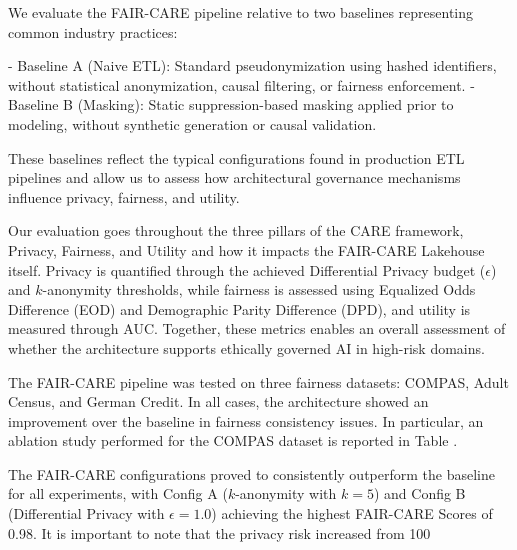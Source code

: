 We evaluate the FAIR-CARE pipeline relative to two baselines representing common industry practices:

- Baseline A (Naive ETL): Standard pseudonymization using hashed identifiers, without statistical anonymization, causal filtering, or fairness enforcement.
- Baseline B (Masking): Static suppression-based masking applied prior to modeling, without synthetic generation or causal validation.

These baselines reflect the typical configurations found in production ETL pipelines and allow us to assess how architectural governance mechanisms influence privacy, fairness, and utility.


Our evaluation goes throughout the three pillars of the CARE framework, Privacy, Fairness, and Utility and how it impacts the FAIR-CARE Lakehouse itself. Privacy is quantified through the achieved Differential Privacy budget ($\epsilon$) and $k$-anonymity thresholds, while fairness is assessed using Equalized Odds Difference (EOD) and Demographic Parity Difference (DPD), and utility is measured through AUC. Together, these metrics enables an overall assessment of whether the architecture supports ethically governed AI in high-risk domains.

The FAIR-CARE pipeline was tested on three fairness datasets: COMPAS, Adult Census, and German Credit. In all cases, the architecture showed an improvement over the baseline in fairness consistency issues. In particular, an ablation study performed for the COMPAS dataset is reported in Table .

The FAIR-CARE configurations proved to consistently outperform the baseline for all experiments, with Config A ($k$-anonymity with $k=5$) and Config B (Differential Privacy with $\epsilon=1.0$) achieving the highest FAIR-CARE Scores of 0.98. It is important to note that the privacy risk increased from 100%

